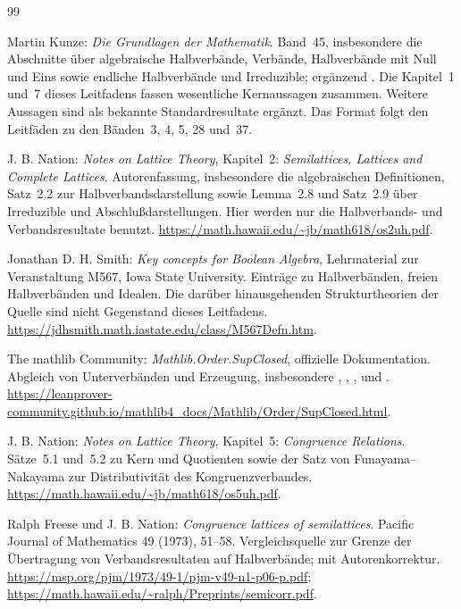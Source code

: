 \renewcommand{\bibname}{Quellen und Bandzuordnung}
\begin{thebibliography}{99}
\footnotesize
\setlength{\itemsep}{6pt}
\setlength{\parskip}{0pt}

Martin Kunze: \emph{Die Grundlagen der Mathematik}.
Band~45, insbesondere die Abschnitte über algebraische Halbverbände,
Verbände, Halbverbände mit Null und Eins sowie endliche Halbverbände
und Irreduzible; ergänzend .
Die Kapitel~1 und~7 dieses Leitfadens fassen wesentliche Kernaussagen
zusammen. Weitere Aussagen sind als bekannte Standardresultate ergänzt.
Das Format folgt den Leitfäden zu den Bänden~3, 4, 5, 28 und~37.

J. B. Nation: \emph{Notes on Lattice Theory}, Kapitel~2:
\emph{Semilattices, Lattices and Complete Lattices}.
Autorenfassung, insbesondere die algebraischen Definitionen,
Satz~2.2 zur Halbverbandsdarstellung sowie Lemma~2.8 und Satz~2.9 über
Irreduzible und Abschlußdarstellungen.
Hier werden nur die Halbverbands- und Verbandsresultate benutzt.
\url{https://math.hawaii.edu/~jb/math618/os2uh.pdf}.

Jonathan D. H. Smith: \emph{Key concepts for Boolean Algebra},
Lehrmaterial zur Veranstaltung M567, Iowa State University.
Einträge zu Halbverbänden, freien Halbverbänden und Idealen.
Die darüber hinausgehenden Strukturtheorien der Quelle sind
nicht Gegenstand dieses Leitfadens.
\url{https://jdhsmith.math.iastate.edu/class/M567Defn.htm}.

The mathlib Community: \emph{Mathlib.Order.SupClosed},
offizielle Dokumentation.
Abgleich von Unterverbänden und Erzeugung, insbesondere
, ,
, 
und .
\url{https://leanprover-community.github.io/mathlib4_docs/Mathlib/Order/SupClosed.html}.

J. B. Nation: \emph{Notes on Lattice Theory}, Kapitel~5:
\emph{Congruence Relations}.
Sätze~5.1 und~5.2 zu Kern und Quotienten sowie der Satz von
Funayama--Nakayama zur Distributivität des Kongruenzverbandes.
\url{https://math.hawaii.edu/~jb/math618/os5uh.pdf}.

Ralph Freese und J. B. Nation:
\emph{Congruence lattices of semilattices}.
Pacific Journal of Mathematics 49 (1973), 51--58.
Vergleichsquelle zur Grenze der Übertragung von Verbandsresultaten
auf Halbverbände; mit Autorenkorrektur.
\url{https://msp.org/pjm/1973/49-1/pjm-v49-n1-p06-p.pdf};
\url{https://math.hawaii.edu/~ralph/Preprints/semicorr.pdf}.


\end{thebibliography}
